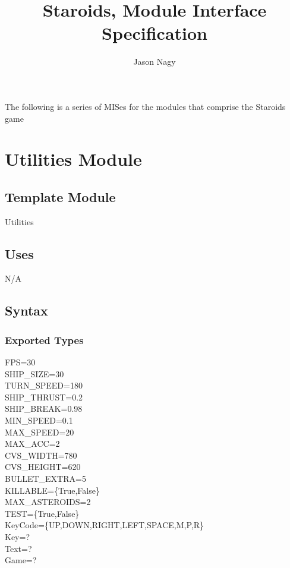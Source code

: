 \documentclass[12pt]{article}
\title{Staroids, Module Interface Specification}
\author{Jason Nagy}
\begin{document}
\maketitle

The following is a series of MISes for the modules that comprise the Staroids game

\newpage

\section*{Utilities Module}

\subsection*{Template Module}

Utilities

\subsection*{Uses}

N/A

\subsection*{Syntax}

\subsubsection*{Exported Types}

FPS=30\\
SHIP_SIZE=30\\
TURN_SPEED=180\\
SHIP_THRUST=0.2\\
SHIP_BREAK=0.98\\
MIN_SPEED=0.1\\
MAX_SPEED=20\\
MAX_ACC=2\\
CVS_WIDTH=780\\
CVS_HEIGHT=620\\
BULLET_EXTRA=5\\
KILLABLE=\{True,False\}\\
MAX_ASTEROIDS=2\\
TEST=\{True,False\}\\
KeyCode=\{UP,DOWN,RIGHT,LEFT,SPACE,M,P,R\}\\
Key=?\\
Text=?\\
Game=?\\
\end{document}
